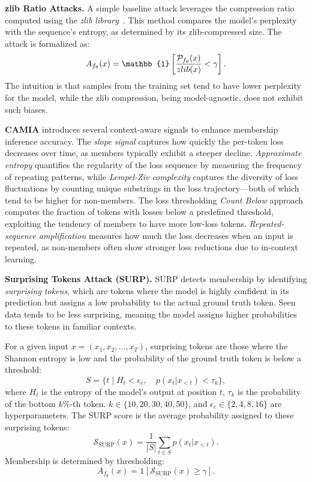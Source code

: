 \textbf{zlib Ratio Attacks.}
A simple baseline attack leverages the compression ratio computed using the \textit{zlib library}~\citep{zlib2004}. This method compares the model’s perplexity with the sequence’s entropy, as determined by its zlib-compressed size. The attack is formalized as:
\[
A_{\fmodelm}(x) = \mathbb{1}\left[\frac{\mathcal{P}_{\fmodelm}(x)}{zlib(x)} < \gamma \right].
\]
The intuition is that samples from the training set tend to have lower perplexity for the model, while the zlib compression, being model-agnostic, does not exhibit such biases.

\textbf{CAMIA} introduces several context-aware signals to enhance membership inference accuracy. The \textit{slope signal} captures how quickly the per-token loss decreases over time, as members typically exhibit a steeper decline. \textit{Approximate entropy} quantifies the regularity of the loss sequence by measuring the frequency of repeating patterns, while \textit{Lempel-Ziv complexity} captures the diversity of loss fluctuations by counting unique substrings in the loss trajectory—both of which tend to be higher for non-members. The loss thresholding \textit{Count Below} approach computes the fraction of tokens with losses below a predefined threshold, exploiting the tendency of members to have more low-loss tokens. \textit{Repeated-sequence amplification} measures how much the loss decreases when an input is repeated, as non-members often show stronger loss reductions due to in-context learning.

\textbf{Surprising Tokens Attack (SURP).}  
SURP detects membership by identifying \textit{surprising tokens}, which are tokens where the model is highly confident in its prediction but assigns a low probability to the actual ground truth token. Seen data tends to be less surprising, meaning the model assigns higher probabilities to these tokens in familiar contexts.

For a given input $x = (x_1, x_2, \dots, x_T)$, surprising tokens are those where the Shannon entropy is low and the probability of the ground truth token is below a threshold:
\begin{equation}
S = \{t \mid H_t < \epsilon_e, \quad p(x_t | x_{<t}) < \tau_k \},
\end{equation}
where $H_t$ is the entropy of the model’s output at position $t$, {$\tau_k$ is the probability of the bottom $k\%$-th token. $k\in\{10,20,30,40,50\}$, and $\epsilon_e\in\{2,4,8,16\}$ are hyperparameters. }The SURP score is the average probability assigned to these surprising tokens:
\begin{equation}
\mathcal{S}_{\text{SURP}}(x) = \frac{1}{|S|} \sum_{t \in S} p(x_t | x_{<t}).
\end{equation}
Membership is determined by thresholding:
\begin{equation}
A_{f_\theta}(x) = \mathbb{1}[\mathcal{S}_{\text{SURP}}(x) \geq \gamma].
\end{equation}

